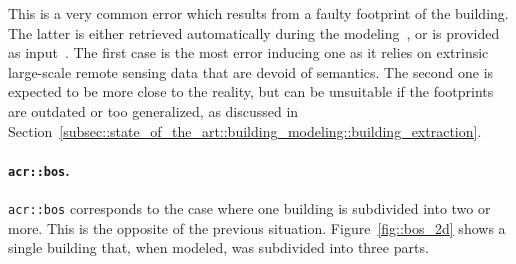                 This is a very common error which results from a faulty footprint of the building.
                The latter is either retrieved automatically during the modeling~\parencite{lafarge2012creating}, or is provided as input~\parencite{durupt2006automatic}.
                The first case is the most error inducing one as it relies on extrinsic large-scale remote sensing data that are devoid of semantics.
                The second one is expected to be more close to the reality, but can be unsuitable if the footprints are outdated or too generalized, as discussed in Section~\ref{subsec::state_of_the_art::building_modeling::building_extraction}.

            \paragraph{\texttt{\acrlong*{acr::bos}}.}
                \texttt{\gls{acr::bos}} corresponds to the case where one building is subdivided into two or more.
                This is the opposite of the previous situation.
                Figure~\ref{fig::bos_2d} shows a single building that, when modeled, was subdivided into three parts.\\

                \begin{figure}[htb]
                    \centering
                \end{figure}

